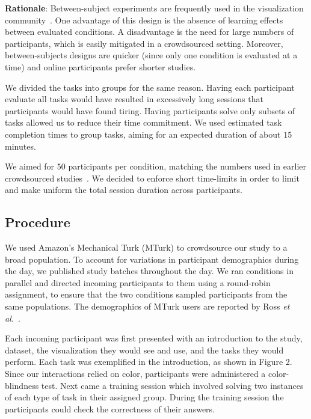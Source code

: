 \vspace{2mm}
\noindent
\textbf{Rationale}: Between-subject experiments are frequently used in the visualization community~\cite{jianu2014display,saket2014node,ziemkiewicz2008shaping,borkin2011evaluation,robertson2008effectiveness,kosara2010mechanical,micallef2012assessing}. One advantage of this design is the absence of learning effects between evaluated conditions. A disadvantage is the need for large numbers of participants, which is easily mitigated in a crowdsourced setting. Moreover, between-subjects designs are quicker (since only one condition is evaluated at a time) and  online participants prefer shorter studies.

We divided the tasks into groups for the same reason. Having each participant evaluate all tasks 
would have resulted in excessively long sessions that participants would have found tiring. Having participants solve only subsets of tasks allowed us to reduce their time commitment. 
We used estimated task completion times to group tasks, aiming for an expected duration of about $15$ minutes.

We aimed for $50$  participants per condition, matching the numbers used in earlier crowdsourced studies~\cite{chapman2014visualizing,jianu2014display}. We decided to enforce short time-limits in order to limit and make uniform the total session duration across participants.

\subsection{Procedure}

We used Amazon's Mechanical Turk (MTurk) to crowdsource our study to a broad population. To account for variations in participant demographics during the day, we published study batches throughout the day. We ran conditions in parallel and directed incoming participants to them using a round-robin assignment, to ensure that the two conditions sampled participants from the same populations. The demographics of MTurk users are reported by Ross {\it et al.}~\cite{ross2010crowdworkers}.

Each incoming participant was first presented with an introduction to the study, dataset, the visualization they would see and use, and the tasks they would perform. Each task was exemplified in the introduction, as shown in Figure 2. Since our interactions relied on color, participants were administered a color-blindness test. Next came a training session which involved solving two instances of each type of task in their assigned group. During the training session the participants could check the correctness of their answers.


